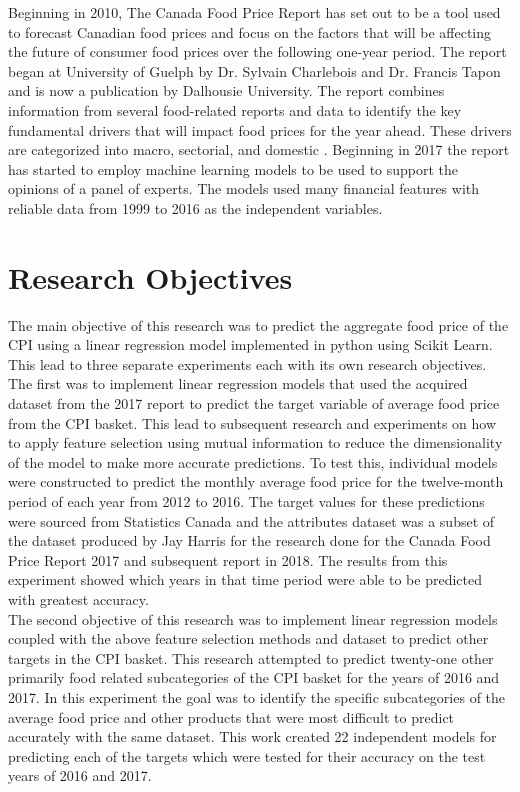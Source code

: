 \documentclass[12pt]{dalthesis}
\begin{document}
Beginning in 2010, The Canada Food Price Report has set out to be a tool used to forecast Canadian food prices and focus on the factors that will be affecting the future of consumer food prices over the following one-year period. The report began at University of Guelph by Dr. Sylvain Charlebois and Dr. Francis Tapon and is now a publication by Dalhousie University. The report combines information from several food-related reports and data to identify the key fundamental drivers that will impact food prices for the year ahead. These drivers are categorized into macro, sectorial, and domestic \cite{foodreport17}. Beginning in 2017 the report has started to employ machine learning models to be used to support the opinions of a panel of experts. The models used many financial features with reliable data from 1999 to 2016 as the independent variables. \cite{foodreport17}



\section{Research Objectives}
The main objective of this research was to predict the aggregate food price of the CPI using a linear regression model implemented in python using Scikit Learn. This lead to three separate experiments each with its own research objectives. The first was to implement linear regression models that used the acquired dataset from the 2017 report to predict the target variable of average food price from the CPI basket. This lead to subsequent research and experiments on how to apply feature selection using mutual information to reduce the dimensionality of the model to 
make more accurate predictions. To test this, individual models were constructed to predict the monthly average food price for the twelve-month period of each year from 2012 to 2016. The target values 
for these predictions were sourced from Statistics Canada and the attributes dataset was a subset of the 
dataset produced by Jay Harris for the research done for the Canada Food Price Report 2017 and 
subsequent report in 2018. The results from this experiment showed which years in that time period were able to be predicted with greatest accuracy. \\

The second objective of this research was to implement linear regression models coupled with the above feature selection methods and dataset to predict other targets in the CPI basket. This research attempted to predict twenty-one other primarily food 
related subcategories of the CPI basket for the years of 2016 and 2017. In this experiment the goal was to identify the specific subcategories of the average food price and other products that were most difficult to predict accurately with the same dataset. This work created 22 independent models for predicting each of the targets which were tested for their accuracy on the test years of 2016 and 2017. \\
\end{document}
